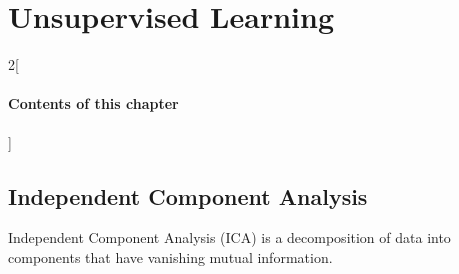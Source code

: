 \chapter{Unsupervised Learning}

\begin{multicols}{2}[\subsubsection*{Contents of this chapter}]
\end{multicols}

\section{Independent Component Analysis}
Independent Component Analysis (ICA) is a decomposition of data into components that have vanishing mutual information. 





\chapauthor{}	